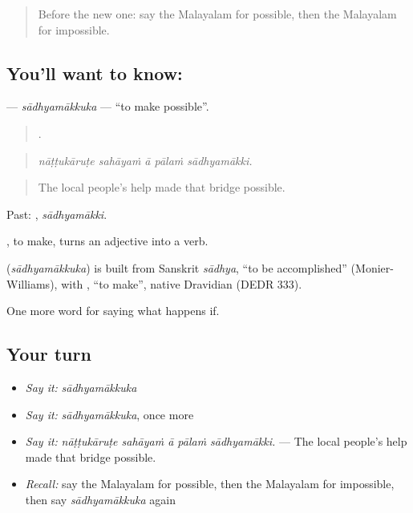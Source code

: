 \label{lesson:ML-C441-sadhyamakkuka}



\begin{quote}
Before the new one: say the Malayalam for possible, then the Malayalam for impossible.
\end{quote}

\subsection*{You'll want to know: }
\textbf{} — \emph{sādhyamākkuka} — \textquotedblleft{}to make possible\textquotedblright{}.

\begin{quote}
    .
\end{quote}

\begin{quote}
\emph{nāṭṭukāruṭe sahāyaṁ ā pālaṁ sādhyamākki.}
\end{quote}

\begin{quote}
The local people's help made that bridge possible.
\end{quote}

Past: , \emph{sādhyamākki}.

, to make, turns an adjective into a verb.

\begin{cousinweb}
\textbf{} (\emph{sādhyamākkuka}) is built from Sanskrit \emph{sādhya}, \textquotedblleft{}to be accomplished\textquotedblright{} (Monier-Williams), with , \textquotedblleft{}to make\textquotedblright{}, native Dravidian (DEDR 333).
\end{cousinweb}

\begin{grammarlens}[title={What you've built}]
One more word for saying what happens if.
\end{grammarlens}

\subsection*{Your turn}
\begin{itemize}
\raggedright
  \item \emph{Say it:} \emph{sādhyamākkuka}
  \item \emph{Say it:} \emph{sādhyamākkuka}, once more
  \item \emph{Say it:} \emph{nāṭṭukāruṭe sahāyaṁ ā pālaṁ sādhyamākki.} — The local people's help made that bridge possible.
  \item \emph{Recall:} say the Malayalam for possible, then the Malayalam for impossible, then say \emph{sādhyamākkuka} again
\end{itemize}

